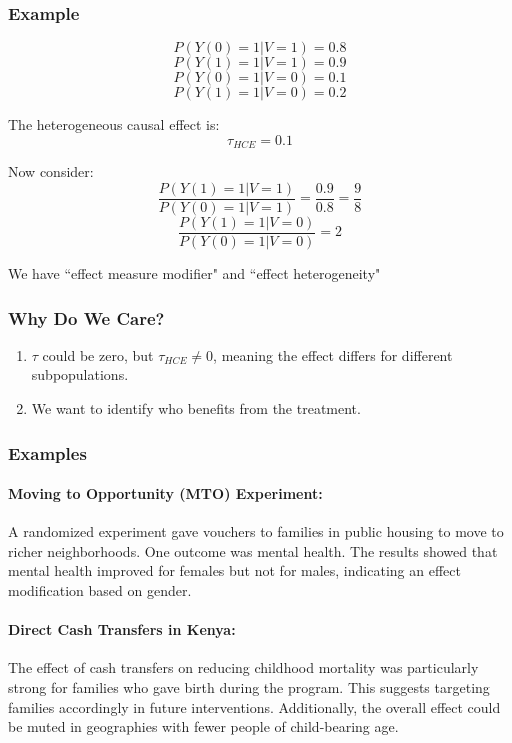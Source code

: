 \subsubsection{Example}

\[
P(Y(0) = 1 | V = 1) = 0.8
\]
\[
P(Y(1) = 1 | V = 1) = 0.9
\]
\[
P(Y(0) = 1 | V = 0) = 0.1
\]
\[
P(Y(1) = 1 | V = 0) = 0.2
\]

The heterogeneous causal effect is:
\[
\tau_{HCE} = 0.1
\]

Now consider:
\[
\frac{P(Y(1) = 1 | V = 1)}{P(Y(0) = 1 | V = 1)} = \frac{0.9}{0.8} = \frac{9}{8}
\]
\[
\frac{P(Y(1) = 1 | V = 0)}{P(Y(0) = 1 | V = 0)} = 2
\]

We have ``effect measure modifier" and ``effect heterogeneity"

\subsubsection{Why Do We Care?}

\begin{enumerate}
    \item $\tau$ could be zero, but $\tau_{HCE} \neq 0$, meaning the effect differs for different subpopulations.
    \item We want to identify who benefits from the treatment.
\end{enumerate}

\subsubsection{Examples}

\paragraph{Moving to Opportunity (MTO) Experiment:} A randomized experiment gave vouchers to families in public housing to move to richer neighborhoods. One outcome was mental health. The results showed that mental health improved for females but not for males, indicating an effect modification based on gender.

\paragraph{Direct Cash Transfers in Kenya:} The effect of cash transfers on reducing childhood mortality was particularly strong for families who gave birth during the program. This suggests targeting families accordingly in future interventions. Additionally, the overall effect could be muted in geographies with fewer people of child-bearing age.

